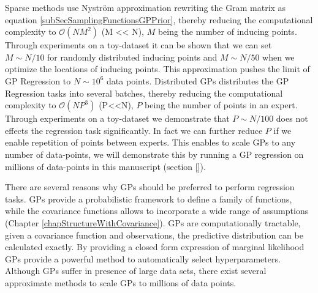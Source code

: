Sparse methods use Nystr\"{o}m approximation rewriting the Gram matrix as equation \ref{subSecSamplingFunctionsGPPrior}, thereby reducing the computational complexity to \(\mathcal{O}(NM^{2})\) (M << N), \(M\) being the number of inducing points. Through experiments on a toy-dataset it can be shown that we can set \(M \sim N/10\) for randomly distributed inducing points and \(M \sim N/50\) when we optimize the locations of inducing points. This approximation pushes the limit of GP Regression to \(N \sim 10^6\) data points. Distributed GPs distributes the GP Regression tasks into several batches, thereby reducing the computational complexity to \(\mathcal{O}(NP^{3})\) (P<<N), \(P\) being the number of points in an expert. Through experiments on a toy-dataset we demonstrate that \(P \sim N/100\) does not effects the regression task significantly. In fact we can further reduce \(P\) if we enable repetition of points between experts. This enables to scale GPs to any number of data-points, we will demonstrate this by running a GP regression on millions of data-points in this manuscript (section \ref{}). 

There are several reasons why GPs should be preferred to perform regression tasks. GPs provide a probabilistic framework to define a family of functions, while the covariance functions allows to incorporate a wide range of assumptions (Chapter \ref{chapStructureWithCovariance}). GPs are computationally tractable, given a covariance function and observations, the predictive distribution can be calculated exactly. By providing a closed form expression of marginal likelihood GPs provide a powerful method to automatically select hyperparameters. Although GPs suffer in presence of large data sets, there exist several approximate methods to scale GPs to millions of data points. 




